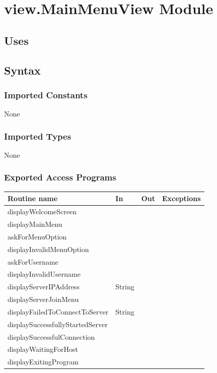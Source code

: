 \documentclass[12pt, titlepage]{article}
\begin{document}
        
        
        
\section* {view.MainMenuView Module}
    \subsection* {Uses}
    \subsection* {Syntax}
    
        \subsubsection* {Imported Constants}
            None
        \subsubsection* {Imported Types}
            None
        \subsubsection* {Exported Access Programs}
        
        \begin{tabular}{| l | l | l | p{6cm} |}
            \hline
            \textbf{Routine name} & \textbf{In} & \textbf{Out} & \textbf{Exceptions}\\
            \hline
            displayWelcomeScreen &  &  & \\
            \hline
            displayMainMenu &  &  &\\
            \hline 
            askForMenuOption &  &  & \\
            \hline 
            displayInvalidMenuOption &  &  &\\
            \hline 
            askForUsername &  &  & \\
            \hline
            displayInvalidUsername &  &  &\\
            \hline 
            displayServerIPAddress & String &  & \\
            \hline 
            displayServerJoinMenu &  &  &\\
            \hline 
            displayFailedToConnectToServer & String &  & \\
            \hline
            displaySuccessfullyStartedServer &  &  &\\
            \hline 
            displaySuccessfulConnection &  &  & \\
            \hline 
            displayWaitingForHost &  &  &\\
            \hline 
            displayExitingProgram &  &  &\\
            \hline 
        \end{tabular}
        
\end{document}
